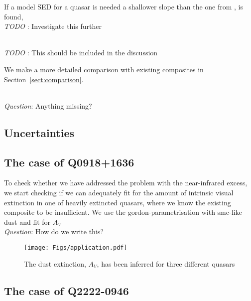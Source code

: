 \documentclass{aa}    %
\newcommand{\figlabel}[1]{\label{fig:#1}}
\newcommand{\sectionname}{Section}
\newcommand{\Sect}[1]{\sectionname~\ref{sect:#1}}
\newcommand{\sect}[1]{\Sect{#1}}
\newcommand{\sectlabel}[1]{\label{sect:#1}}
\newcommand{\todo}[3]{{\color{#2}\emph{#1}: #3}}
\newcommand{\jstodo}[1]{\todo{ \\TODO }{red}{#1}}
\newcommand{\qtodo}[1]{\todo{\\ Question}{red}{#1}}
\begin{document}
If a model SED for a quasar is needed a shallower slope than the one from \citep{VandenBerk2001}, is found, 
\jstodo{Investigate this further}


\jstodo{This should be included in the discussion}

We make a more detailed comparison with existing composites in \sect{comparison}. 
 
 \qtodo{Anything missing?}


\subsection{Uncertainties}  \sectlabel{uncertainty}




\subsection{The case of Q0918+1636}  \sectlabel{q0918}

To check whether we have addressed the problem
 with the near-infrared excess, we start checking if we can adequately fit for the amount of intrinsic visual extinction in one of heavily extincted quasars, where we know the existing composite to be insufficient. We use the gordon-parametrisation with smc-like dust and fit for $A_V$
 \qtodo{How do we write this?}
 
 
  
   \begin{figure}[hbtp]
     \centering
     \texttt{[image: Figs/application.pdf]}
     \caption[]{The dust extinction, $A_V$, has been inferred for three different quasars}
     \figlabel{application}
   \end{figure}
 
 
 
 
 
 \subsection{The case of Q2222-0946}  \sectlabel{q2222}
\end{document}
